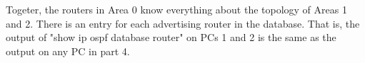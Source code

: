 Togeter, the routers in Area 0 know everything about the topology of Areas 1 and 2. There is an entry for each advertising router in the database. That is, the output of "show ip ospf database router" on PCs 1 and 2 is the same as the output on any PC in part 4.
